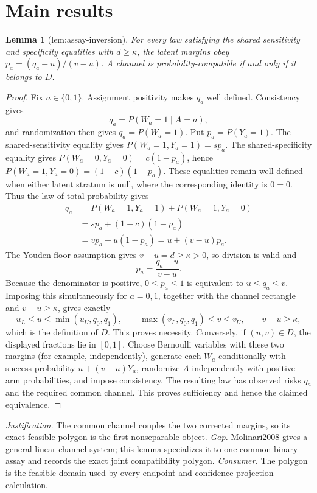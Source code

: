 \documentclass{article}
\newtheorem{lemma}{Lemma}
\begin{document}
\section{Main results}

\begin{lemma}[lem:assay-inversion]\label{lem:assay-inversion}
For every law satisfying the shared sensitivity and specificity equalities with \(d\ge\kappa\), the latent margins obey \(p_a=(q_a-u)/(v-u)\). A channel is probability-compatible if and only if it belongs to \(D\).
\end{lemma}
\begin{proof}
Fix \(a\in\{0,1\}\).  Assignment positivity makes \(q_a\) well defined.  Consistency gives
\[
 q_a=P(W_a=1\mid A=a),
\]
and randomization then gives \(q_a=P(W_a=1)\).  Put \(p_a=P(Y_a=1)\).  The shared-sensitivity equality gives \(P(W_a=1,Y_a=1)=sp_a\).  The shared-specificity equality gives \(P(W_a=0,Y_a=0)=c(1-p_a)\), hence \(P(W_a=1,Y_a=0)=(1-c)(1-p_a)\).  These equalities remain well defined when either latent stratum is null, where the corresponding identity is \(0=0\).  Thus the law of total probability gives
\[
\begin{aligned}
q_a
 &=P(W_a=1,Y_a=1)+P(W_a=1,Y_a=0)\\
 &=s p_a+(1-c)(1-p_a)\\
 &=v p_a+u(1-p_a)=u+(v-u)p_a.
\end{aligned}
\]
The Youden-floor assumption gives \(v-u=d\geq\kappa>0\), so division is valid and
\[
 p_a=\frac{q_a-u}{v-u}.
\]
Because the denominator is positive, \(0\leq p_a\leq1\) is equivalent to \(u\leq q_a\leq v\).  Imposing this simultaneously for \(a=0,1\), together with the channel rectangle and \(v-u\geq\kappa\), gives exactly
\[
 u_L\leq u\leq\min(u_U,q_0,q_1),\qquad
 \max(v_L,q_0,q_1)\leq v\leq v_U,
 \qquad v-u\geq\kappa,
\]
which is the definition of \(D\).  This proves necessity.  Conversely, if \((u,v)\in D\), the displayed fractions lie in \([0,1]\).  Choose Bernoulli variables with these two margins (for example, independently), generate each \(W_a\) conditionally with success probability \(u+(v-u)Y_a\), randomize \(A\) independently with positive arm probabilities, and impose consistency.  The resulting law has observed risks \(q_a\) and the required common channel.  This proves sufficiency and hence the claimed equivalence.
\end{proof}
\par\smallskip\noindent \textit{Justification.} The common channel couples the two corrected margins, so its exact feasible polygon is the first nonseparable object. \textit{Gap.} Molinari2008 gives a general linear channel system; this lemma specializes it to one common binary assay and records the exact joint compatibility polygon. \textit{Consumer.} The polygon is the feasible domain used by every endpoint and confidence-projection calculation.
\end{document}
